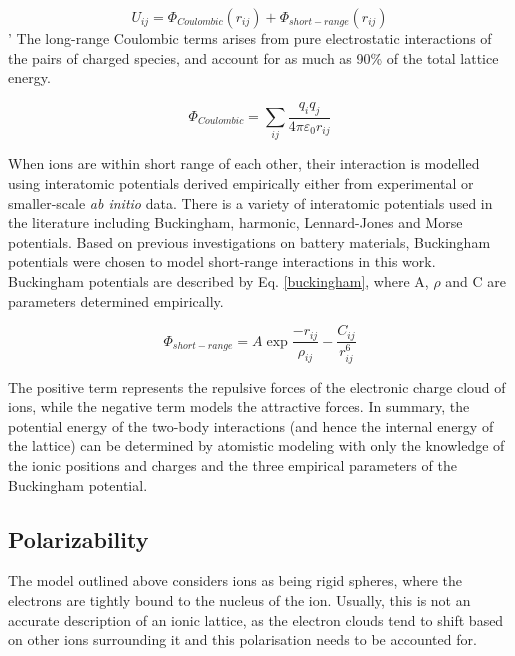 \documentclass[12pt]{report}
\begin{document}
\begin{equation}
    U_{ij} = \Phi_{Coulombic}(r_{ij}) + \Phi_{short-range}(r_{ij})
\label{twobody}
\end{equation}
'
\noindent
The long-range Coulombic terms arises from pure electrostatic interactions of the pairs of charged species, and account for as much as 90\% of the total lattice energy.\cite{catlow2013}

\begin{equation}
    \Phi_{Coulombic} = \sum_{ij} \frac{q_iq_j}{4\pi\varepsilon_0r_{ij}}
\label{coulomb}
\end{equation}

\noindent
When ions are within short range of each other, their interaction is modelled using interatomic potentials derived empirically either from experimental or smaller-scale \textit{ab initio} data.
There is a variety of interatomic potentials used in the literature including Buckingham, harmonic, Lennard-Jones and Morse potentials.\cite{gale2003, buckingham1938}
Based on previous investigations on battery materials, Buckingham potentials were chosen to model short-range interactions in this work.
Buckingham potentials are described by Eq. \ref{buckingham}, where A, $\rho$ and C are parameters determined empirically.

\begin{equation}
    \Phi_{short-range} = A\exp\frac{-r_{ij}}{\rho_{ij}} - \frac{C_{ij}}{r_{ij}^6}
\label{buckingham}
\end{equation}

\noindent
The positive term represents the repulsive forces of the electronic charge cloud of ions, while the negative term models the attractive forces.
In summary, the potential energy of the two-body interactions (and hence the internal energy of the lattice) can be determined by atomistic modeling with only the knowledge of the ionic positions and charges and the three empirical parameters of the Buckingham potential.

\subsection{Polarizability}

The model outlined above considers ions as being rigid spheres, where the electrons are tightly bound to the nucleus of the ion.
Usually, this is not an accurate description of an ionic lattice, as the electron clouds tend to shift based on other ions surrounding it and this polarisation needs to be accounted for. 
\end{document}
